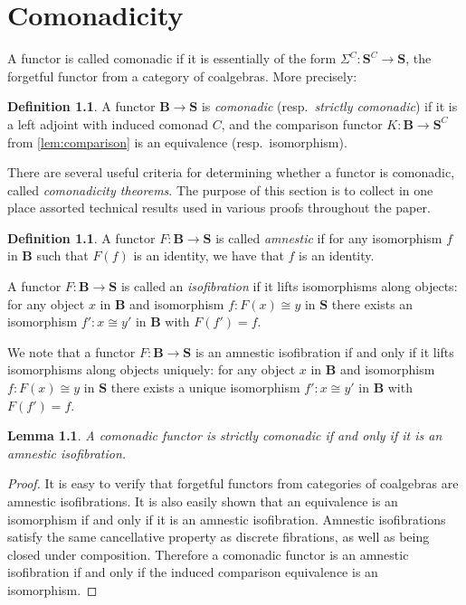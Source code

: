 \documentclass[11pt, oneside, article]{memoir}
\makeatletter
\theoremstyle{plain}
\newtheorem{lemma}[theorem]{Lemma}
\theoremstyle{definition}
\newtheorem{definition}[def]{Definition}
\theoremstyle{remark}
\def\theHsection{\theHchapter.\arabic{section}}
\def\theHtheorem{\theHsection.\arabic{theorem}}
\def\theHcorollary{\theHsection.\arabic{theorem}}
\def\theHproposition{\theHsection.\arabic{theorem}}
\def\theHlemma{\theHsection.\arabic{theorem}}
\def\theHconjecture{\theHsection.\arabic{theorem}}
\def\theHdefinition{\theHsection.\arabic{theorem}}
\def\theHmyremark{\theHsection.\arabic{theorem}}
\def\theHmyexample{\theHsection.\arabic{theorem}}
\def\theHmyconvention{\theHsection.\arabic{theorem}}
\def\theHmywarning{\theHsection.\arabic{theorem}}
\def\theHmycounterexample{\theHsection.\arabic{theorem}}
\def\theHdef{\theHsection.\arabic{theorem}}
\def\theHrem{\theHsection.\arabic{theorem}}
\let\@origchapter\chapter
\renewcommand{\thechapter}{\arabic{chapter}}
\newif\if@inappendixmode
\newcommand{\@syncthmdisplay}{%
  \global\let\thedef\thetheorem
  \global\let\therem\thetheorem
  \global\let\thedefinition\thetheorem
  \global\let\thelemma\thetheorem
  \global\let\thecorollary\thetheorem
  \global\let\theproposition\thetheorem
  \global\let\theconjecture\thetheorem
  \global\let\themyremark\thetheorem
  \global\let\themyexample\thetheorem
  \global\let\themyconvention\thetheorem
  \global\let\themywarning\thetheorem
  \global\let\themycounterexample\thetheorem
}
\newcommand{\@syncthmH}[1]{%
  \gdef\theHtheorem{#1}\gdef\theHcorollary{#1}\gdef\theHproposition{#1}%
  \gdef\theHlemma{#1}\gdef\theHconjecture{#1}\gdef\theHdefinition{#1}%
  \gdef\theHmyremark{#1}\gdef\theHmyexample{#1}\gdef\theHmyconvention{#1}%
  \gdef\theHmywarning{#1}\gdef\theHmycounterexample{#1}%
  \gdef\theHdef{#1}\gdef\theHrem{#1}%
}
\renewcommand{\chapter}{%
  \if@inappendixmode%
    \renewcommand{\thechapter}{\Alph{chapter}}%
    \renewcommand{\theHchapter}{\Alph{chapter}}%
    \counterwithout*{theorem}{section}%
    \gdef\thetheorem{\thechapter.\arabic{theorem}}%
    \@syncthmdisplay
    \@syncthmH{\theHchapter.\arabic{theorem}}%
  \else
    \renewcommand{\thechapter}{\arabic{chapter}}%
    \renewcommand{\theHchapter}{\arabic{chapter}}%
  \fi
  \@origchapter
}
\newcommand{\cat}[1]{\mathbf{#1}}
\newcommand{\CoalgOn}[2]{{#2}^{#1}}
\newcommand{\CoalgS}[1]{\CoalgOn{#1}{\bS}}
\newcommand{\carr}{\Sigma}
\newcommand{\car}[1]{\carr^{#1}}
\newcommand{\carC}{\car{\cC}}
\newcommand{\cmnd}[1]{{#1}}
\newcommand{\cC}{\cmnd{C}}
\newcommand{\bB}{\cat{B}}
\newcommand{\bS}{\cat{S}}
\newcommand{\CS}{\CoalgS{\cC}}
\makeatother
\begin{document}
\chapter{Comonadicity}\label{sec:comonadicity}
\appendixtocspace

A functor is called comonadic if it is essentially of the form
$\carC \colon \CS \to \bS$, the forgetful functor from a category of
coalgebras. More precisely:

\begin{definition}
  A functor $\bB \to \bS$ is \emph{comonadic} (resp.\ \emph{strictly
    comonadic}) if it is a left adjoint with induced comonad $\cC$,
  and the comparison functor $K \colon \bB \to \CS$ from
  \cref{lem:comparison} is an equivalence (resp.\ isomorphism).
\end{definition}

There are several useful criteria for determining whether a functor is
comonadic, called \emph{comonadicity theorems}. The purpose of this
section is to collect in one place assorted technical results used in
various proofs throughout the paper.

\begin{definition}\label{def:amnesticisofibration}
  A functor $F \colon \bB \to \bS$ is called \emph{amnestic} if for
  any isomorphism $f$ in $\bB$ such that $F(f)$ is an identity, we
  have that $f$ is an identity.

  A functor $F \colon \bB \to \bS$ is called an \emph{isofibration} if it lifts isomorphisms
  along objects: for any object $x$ in $\bB$ and isomorphism
  $f \colon F(x) \cong y$ in $\bS$ there exists an isomorphism
  $f' \colon x \cong y'$ in $\bB$ with $F(f') = f$.
\end{definition}

We note that a functor $F \colon \bB \to \bS$ is an amnestic isofibration
if and only if it lifts isomorphisms along objects uniquely: for any
object $x$ in $\bB$ and isomorphism $f \colon F(x) \cong y$ in $\bS$
there exists a unique isomorphism $f' \colon x \cong y'$ in $\bB$ with
$F(f') = f$.

\begin{lemma}
  A comonadic functor is strictly comonadic if and only if it is an
  amnestic isofibration.
\end{lemma}
\begin{proof}
  It is easy to verify that forgetful functors from categories of
  coalgebras are amnestic isofibrations. It is also easily shown that
  an equivalence is an isomorphism if and only if it is an amnestic
  isofibration. Amnestic isofibrations satisfy the same cancellative
  property as discrete fibrations, as well as being closed under
  composition. Therefore a comonadic functor is an amnestic
  isofibration if and only if the induced comparison equivalence is an
  isomorphism.
\end{proof}
\end{document}
